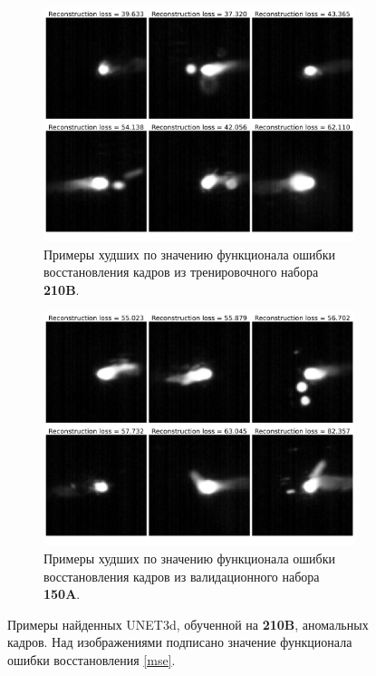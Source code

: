 \documentclass{article}
\begin{document}
    \begin{figure}[]
        \centering
        \begin{subfigure}{.47\textwidth}
            \centering
            \includegraphics[scale=.15]{unet_train_worst_after.pdf}
            \caption{Примеры худших по значению функционала ошибки восстановления кадров из тренировочного набора \textbf{210B}.}\label{unet_train_worst_after}
        \end{subfigure}
        \hfill
        \begin{subfigure}{.47\textwidth}
            \centering
            \includegraphics[scale=.15]{unet_test_worst_after.pdf}
            \caption{Примеры худших по значению функционала ошибки восстановления кадров из валидационного набора \textbf{150A}.}\label{unet_test_worst_after}
        \end{subfigure}
        \caption{Примеры найденных UNET3d, обученной на \textbf{210B}, аномальных кадров. Над изображениями подписано значение функционала ошибки восстановления \eqref{mse}.}\label{unet_worst_after}
    \end{figure}
\end{document}
